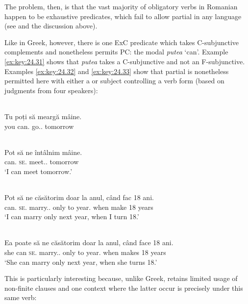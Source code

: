 \documentclass[output=paper]{langsci/langscibook}
\begin{document}
The problem, then, is that the vast majority of obligatory  verbs in
Romanian happen to be exhaustive  predicates, which fail to allow
partial  in any language (see \citealt{Landau2000,Landau2004,Landau2015}
and the discussion above).

Like in Greek, however, there is one \gls{ExC}
predicate which takes C-subjunctive complements and nonetheless permits PC: the
modal \emph{putea} ‘can’. Example \eqref{ex:key:24.31} shows that \emph{putea} takes a
C-subjunctive and not an F-subjunctive. Examples \eqref{ex:key:24.32} and \eqref{ex:key:24.33} show that
partial  is nonetheless permitted here with either a \Fsg{} or \Tsg{}
subject controlling a \Fpl{} verb form (based on judgments from four speakers):

\ea%
    \label{ex:key:24.31} \\
	\gll \llap{*}Tu   poți   să   meargă   mâine.\\
    you   can.\Ssg{}   \Sbjv{}   go.\Sbjv{}.\Third{} tomorrow\\
    \glt
\z

\ea%
    \label{ex:key:24.32} \\
	\gll Pot   să   ne     întâlnim     mâine.\\
    can.\Fsg{}  \Sbjv{}  \textsc{se}.\Fpl{}  meet.\Sbjv{}.\Fpl{}  tomorrow\\
	\glt ‘I can meet tomorrow.’
\z

\ea%
    \label{ex:key:24.33} \\
	\gll Pot   să   ne    căsătorim         doar la anul,      când fac      18 ani.\\
    can.\Fsg{}  \Sbjv{}  \textsc{se}.\Fpl{} marry.\Sbjv{}.\Fpl{} only to year.\Def{} when make 18 years\\
	\glt ‘I can marry only next year, when I turn 18.’\newpage
\z

\ea%
    \label{ex:key:24.34} \\
	\gll Ea  poate   să   ne   căsătorim         doar la anul,      când face   18 ani.\\
    she can   \Sbjv{}   \textsc{se}.\Fpl{} marry.\Sbjv{}.\Fpl{} only  to year.\Def{}      when makes   18 years\\
	\glt ‘She can marry only next year, when she turns 18.’
\z

This is particularly interesting because, unlike Greek,  retains
limited usage of non-finite clauses and one context where the latter occur is
precisely under this same verb:
\end{document}
